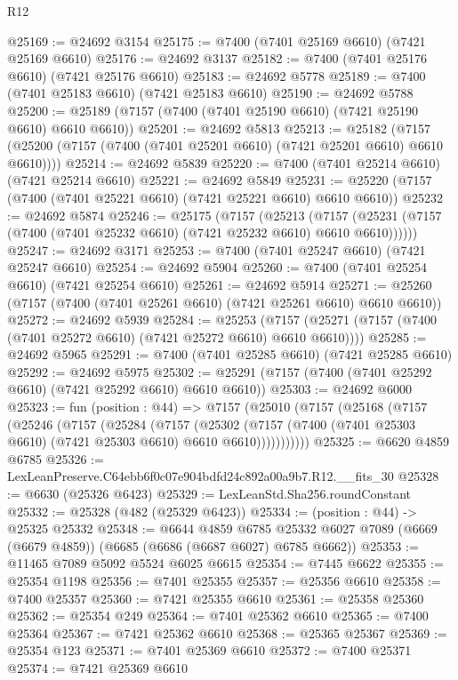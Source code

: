 \begin{lexlean}{R12}
\begin{coremodule}
@25169 := @24692 @3154
@25175 := @7400 (@7401 @25169 @6610) (@7421 @25169 @6610)
@25176 := @24692 @3137
@25182 := @7400 (@7401 @25176 @6610) (@7421 @25176 @6610)
@25183 := @24692 @5778
@25189 := @7400 (@7401 @25183 @6610) (@7421 @25183 @6610)
@25190 := @24692 @5788
@25200 := @25189 (@7157 (@7400 (@7401 @25190 @6610) (@7421 @25190 @6610) @6610 @6610))
@25201 := @24692 @5813
@25213 := @25182
    (@7157 (@25200 (@7157 (@7400 (@7401 @25201 @6610) (@7421 @25201 @6610) @6610 @6610))))
@25214 := @24692 @5839
@25220 := @7400 (@7401 @25214 @6610) (@7421 @25214 @6610)
@25221 := @24692 @5849
@25231 := @25220 (@7157 (@7400 (@7401 @25221 @6610) (@7421 @25221 @6610) @6610 @6610))
@25232 := @24692 @5874
@25246 := @25175
    (@7157
      (@25213
        (@7157 (@25231 (@7157 (@7400 (@7401 @25232 @6610) (@7421 @25232 @6610) @6610 @6610))))))
@25247 := @24692 @3171
@25253 := @7400 (@7401 @25247 @6610) (@7421 @25247 @6610)
@25254 := @24692 @5904
@25260 := @7400 (@7401 @25254 @6610) (@7421 @25254 @6610)
@25261 := @24692 @5914
@25271 := @25260 (@7157 (@7400 (@7401 @25261 @6610) (@7421 @25261 @6610) @6610 @6610))
@25272 := @24692 @5939
@25284 := @25253
    (@7157 (@25271 (@7157 (@7400 (@7401 @25272 @6610) (@7421 @25272 @6610) @6610 @6610))))
@25285 := @24692 @5965
@25291 := @7400 (@7401 @25285 @6610) (@7421 @25285 @6610)
@25292 := @24692 @5975
@25302 := @25291 (@7157 (@7400 (@7401 @25292 @6610) (@7421 @25292 @6610) @6610 @6610))
@25303 := @24692 @6000
@25323 := fun (position : @44) =>
  @7157
    (@25010
      (@7157
        (@25168
          (@7157
            (@25246
              (@7157
                (@25284
                  (@7157
                    (@25302
                      (@7157 (@7400 (@7401 @25303 @6610) (@7421 @25303 @6610) @6610 @6610)))))))))))
@25325 := @6620 @4859 @6785
@25326 := LexLeanPreserve.C64ebb6f0c07e904bdfd24c892a00a9b7.R12.__fits_30
@25328 := @6630 (@25326 @6423)
@25329 := LexLeanStd.Sha256.roundConstant
@25332 := @25328 (@482 (@25329 @6423))
@25334 := (position : @44) -> @25325 @25332
@25348 := @6644
    @4859
    @6785
    @25332
    @6027
    @7089
    (@6669 (@6679 @4859))
    (@6685 (@6686 (@6687 @6027) @6785 @6662))
@25353 := @11465 @7089 @5092 @5524 @6025 @6615
@25354 := @7445 @6622
@25355 := @25354 @1198
@25356 := @7401 @25355
@25357 := @25356 @6610
@25358 := @7400 @25357
@25360 := @7421 @25355 @6610
@25361 := @25358 @25360
@25362 := @25354 @249
@25364 := @7401 @25362 @6610
@25365 := @7400 @25364
@25367 := @7421 @25362 @6610
@25368 := @25365 @25367
@25369 := @25354 @123
@25371 := @7401 @25369 @6610
@25372 := @7400 @25371
@25374 := @7421 @25369 @6610

\end{coremodule}
\end{lexlean}

